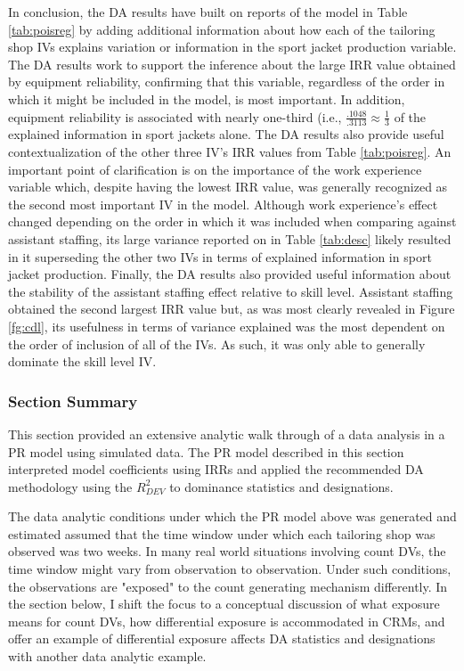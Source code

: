 \documentclass[ShortAfour,times,sageapa]{sagej}
\begin{document}
	In conclusion, the DA results have built on reports of the model in Table \ref{tab:poisreg} by adding additional information about how each of the tailoring shop IVs explains variation or information in the sport jacket production variable. 
	The DA results work to support the inference about the large IRR value obtained by equipment reliability, confirming that this variable, regardless of the order in which it might be included in the model, is most important. 
	In addition, equipment reliability is associated with nearly one-third (i.e., $\frac{.1048}{.3113} \approx \frac{1}{3}$ of the explained information in sport jackets alone.
	The DA results also provide useful contextualization of the other three IV's IRR values from Table \ref{tab:poisreg}. 
	An important point of clarification is on the importance of the work experience variable which, despite having the lowest IRR value, was generally recognized as the second most important IV in the model.
	Although work experience's effect changed depending on the order in which it was included when comparing against assistant staffing, its large variance reported on in Table \ref{tab:desc} likely resulted in it superseding the other two IVs in terms of explained information in sport jacket production.
	Finally, the DA results also provided useful information about the stability of the assistant staffing effect relative to skill level.
	Assistant staffing obtained the second largest IRR value but, as was most clearly revealed in Figure \ref{fg:cdl}, its usefulness in terms of variance explained was the most dependent on the order of inclusion of all of the IVs.
	As such, it was only able to generally dominate the skill level IV.

	\subsubsection{Section Summary}
	
	This section provided an extensive analytic walk through of a data analysis in a PR model using simulated data.
	The PR model described in this section interpreted model coefficients using IRRs and applied the recommended DA methodology using the $R^2_{DEV}$ to dominance statistics and designations.
	
	The data analytic conditions under which the PR model above was generated and estimated assumed that the time window under which each tailoring shop was observed was two weeks.
	In many real world situations involving count DVs, the time window might vary from observation to observation. 
	Under such conditions, the observations are "exposed" to the count generating mechanism differently.
	In the section below, I shift the focus to a conceptual discussion of what exposure means for count DVs, how differential exposure is accommodated in CRMs, and offer an example of differential exposure affects DA statistics and designations with another data analytic example.
	
\end{document}
